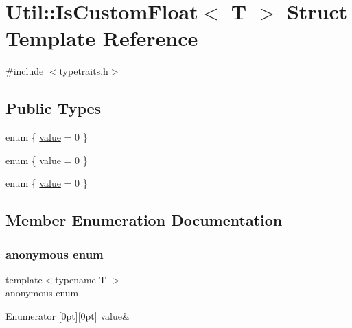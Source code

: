 \hypertarget{structUtil_1_1IsCustomFloat}{}\section{Util\+:\+:Is\+Custom\+Float$<$ T $>$ Struct Template Reference}
\label{structUtil_1_1IsCustomFloat}


{\ttfamily \#include $<$typetraits.\+h$>$}

\subsection*{Public Types}
\begin{DoxyCompactItemize}
\item 
enum \{ \mbox{\hyperlink{structUtil_1_1IsCustomFloat_aa75d2ac07f2674cf87f89c3a74975dbaa9731c1a78425d1ca970cc086ff7699e1}{value}} = 0
 \}
\item 
enum \{ \mbox{\hyperlink{structUtil_1_1IsCustomFloat_aa75d2ac07f2674cf87f89c3a74975dbaa9731c1a78425d1ca970cc086ff7699e1}{value}} = 0
 \}
\item 
enum \{ \mbox{\hyperlink{structUtil_1_1IsCustomFloat_aa75d2ac07f2674cf87f89c3a74975dbaa9731c1a78425d1ca970cc086ff7699e1}{value}} = 0
 \}
\end{DoxyCompactItemize}


\subsection{Member Enumeration Documentation}
\mbox{\label{structUtil_1_1IsCustomFloat_a44e5b740b1581488b8da0c7a84771533}} 
\subsubsection{\texorpdfstring{anonymous enum}{anonymous enum}}
{\footnotesize\ttfamily template$<$typename T $>$ \\
anonymous enum}

\begin{DoxyEnumFields}{Enumerator}
[0pt][0pt]{}\mbox{\label{structUtil_1_1IsCustomFloat_aa75d2ac07f2674cf87f89c3a74975dbaa9731c1a78425d1ca970cc086ff7699e1}} 
value&\\
\hline

\end{DoxyEnumFields}
\mbox{\label{structUtil_1_1IsCustomFloat_a2ad9e3368eb4a8922eb9e35c88a119e2}} 
